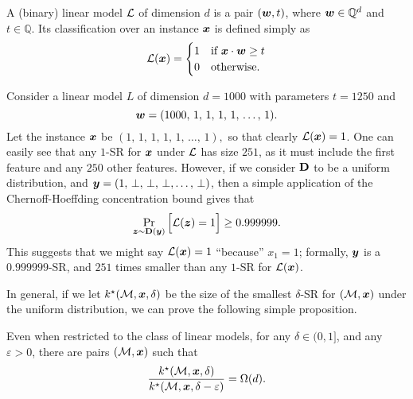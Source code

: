 \begin{definition}
	A (binary) linear model $\mathcal{L}$ of dimension $d$ is a pair $({\bm{w}}, t)$, where ${\bm{w}} \in \mathbb{Q}^d$ and $t \in \mathbb{Q}$. Its classification over an instance ${\bm{x}}$ is defined simply as 
	\[
		\mathcal{L}({\bm{x}}) = \begin{cases}
			1 & \text{if } {\bm{x}} \cdot {\bm{w}} \geq t\\
			0 & \text{otherwise}.
		\end{cases}
	\]
	\label{def:linear-models}
\end{definition}



\begin{example}
Consider a linear model $L$ of dimension $d= 1000$ with parameters $t = 1250$ and
$$
	{\bm{w}} = (
		1000, \, 1, \, 1, \,  1, \,  1, \,  \ldots, \, 1
	).
$$
Let the instance ${\bm{x}}$ be 
	$(
		1, \, 1, \, 1, \,  1, \,  1, \,  \ldots, \, 1
	),$ so that clearly $\mathcal{L}({\bm{x}}) = 1$.
One can easily see that any $1$-SR for ${\bm{x}}$ under $\mathcal{L}$ has size $251$, as it must include the first feature and any $250$ other features.
However, if we consider $\mathbf{D}$ to be a uniform distribution, and ${\bm{y}} = (
		1, \, \bot, \, \bot, \,  \bot,  \ldots, \, \bot
	)$, then a simple application of the Chernoff-Hoeffding concentration bound gives that
\[
	\Pr_{{\bm{z}} \sim \mathbf{D}({\bm{y}})}\Big[ \mathcal{L}({\bm{z}}) = 1\Big] \geq  0.999999.\]
	This suggests that we might say $\mathcal{L}({\bm{x}}) = 1$ ``because'' $x_1 = 1$; formally, ${\bm{y}}$ is a $0.999999$-SR, and $251$ times smaller than any $1$-SR for $\mathcal{L}({\bm{x}})$.
\label{ex:delta-sr-size}
\end{example}

In general, if we let $k^\star(\mathcal{M}, {\bm{x}}, \delta)$ be the size of the smallest $\delta$-SR for $(\mathcal{M}, {\bm{x}})$ under the uniform distribution, we can prove the following simple proposition.

\begin{proposition}
	Even when restricted to the class of linear models, for any $\delta \in (0, 1]$, and any $\varepsilon > 0$, there are pairs $(\mathcal{M}, {\bm{x}})$  such that
	\[ 
		\frac{k^\star(\mathcal{M}, {\bm{x}}, \delta)}{k^\star(\mathcal{M}, {\bm{x}}, \delta-\varepsilon)} = \Omega(d).
	\]
\end{proposition}